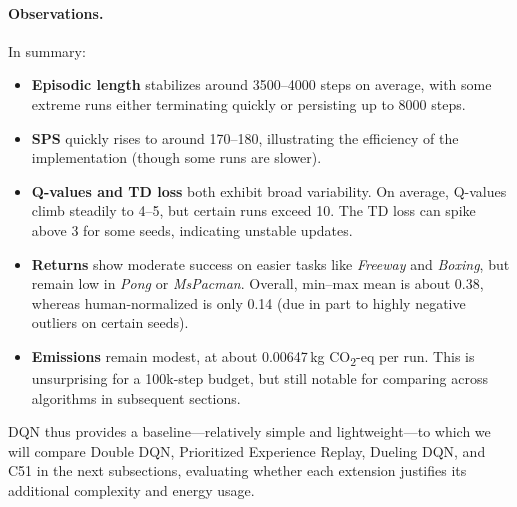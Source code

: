 \paragraph{Observations.}
In summary:
\begin{itemize}
	\item \textbf{Episodic length} stabilizes around 3500--4000 steps on average, 
	with some extreme runs either terminating quickly or persisting up to 8000 steps.
	\item \textbf{SPS} quickly rises to around 170--180, illustrating the efficiency 
	of the implementation (though some runs are slower).
	\item \textbf{Q-values and TD loss} both exhibit broad variability. On average, 
	Q-values climb steadily to 4--5, but certain runs exceed 10. The TD loss 
	can spike above 3 for some seeds, indicating unstable updates.
	\item \textbf{Returns} show moderate success on easier tasks like \textit{Freeway} 
	and \textit{Boxing}, but remain low in \textit{Pong} or \textit{MsPacman}. Overall, 
	min--max mean is about 0.38, whereas human-normalized is only 0.14 (due in part 
	to highly negative outliers on certain seeds).
	\item \textbf{Emissions} remain modest, at about 0.00647\,kg CO\textsubscript{2}-eq 
	per run. This is unsurprising for a 100k-step budget, but still notable for 
	comparing across algorithms in subsequent sections.
\end{itemize}

DQN thus provides a baseline—relatively simple and lightweight—to which we will 
compare Double DQN, Prioritized Experience Replay, Dueling DQN, and C51 
in the next subsections, evaluating whether each extension justifies 
its additional complexity and energy usage.

